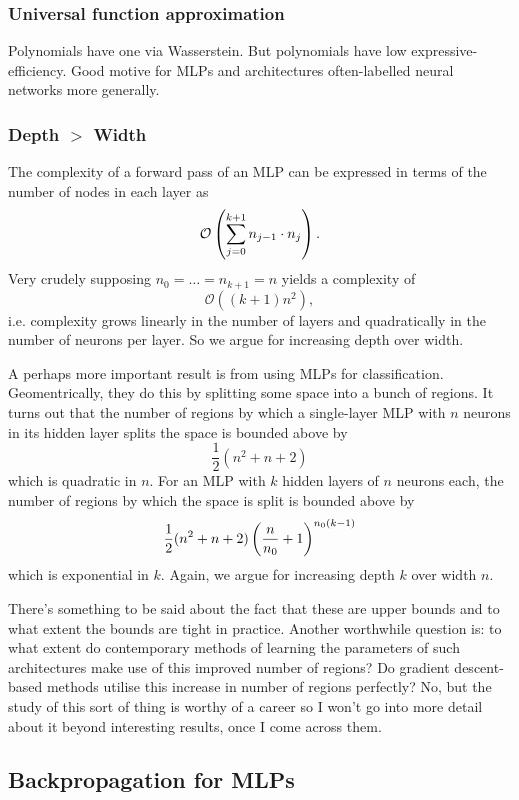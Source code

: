 \documentclass[11pt]{article}
\begin{document}
\subsubsection{Universal function approximation}
\label{subsubsec:universal_function_approximation_theorem}
Polynomials have one via Wasserstein. But polynomials have low expressive-efficiency. Good motive for MLPs and architectures often-labelled neural networks more generally.

\subsubsection{Depth $>$ Width}
\label{subsubsec:deep_MLPs}
The complexity of a forward pass of an MLP can be expressed in terms of the number of nodes in each layer as
$$
\mathcal{O}
\left(
\sum_{j=0}^{k+1}n_{j-1}\cdot n_j
\right).
$$
Very crudely supposing $n_0=\dots=n_{k+1}=n$ yields a complexity of
$$
\mathcal{O}((k+1)n^2),
$$
i.e. complexity grows linearly in the number of layers and quadratically in the number of neurons per layer. So we argue for increasing depth over width.

A perhaps more important result is from using MLPs for classification. Geomentrically, they do this by splitting some space into a bunch of regions. It turns out that the number of regions by which a single-layer MLP with $n$ neurons in its hidden layer splits the space is bounded above by
$$
\frac{1}{2}(n^2+n+2)
$$
which is quadratic in $n$. For an MLP with $k$ hidden layers of $n$ neurons each, the number of regions by which the space is split is bounded above by
$$
\frac{1}{2}(n^2+n+2)\left(\frac{n}{n_0}+1\right)^{n_0(k-1)}
$$
which is exponential in $k$. Again, we argue for increasing depth $k$ over width $n$.

There's something to be said about the fact that these are upper bounds and to what extent the bounds are tight in practice. Another worthwhile question is: to what extent do contemporary methods of learning the parameters of such architectures make use of this improved number of regions? Do gradient descent-based methods utilise this increase in number of regions perfectly? No, but the study of this sort of thing is worthy of a career so I won't go into more detail about it beyond interesting results, once I come across them.

\subsection{Backpropagation for MLPs}
\label{subsec:backprop}
\end{document}
